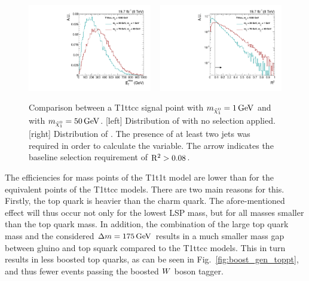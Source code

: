 \begin{figure}[htbp]
 \centering
\includegraphics[width=0.48\textwidth]{figures/razor_interpretation/Eff_drop_met}
~
\includegraphics[width=0.48\textwidth]{figures/razor_interpretation/Eff_drop_rsq}
\caption{Comparison between a T1ttcc signal point with $m_{\tilde{\chi}_1^0} = 1\,\text{Ge\hspace{-.08em}V}$ and with $m_{\tilde{\chi}_1^0} =
50\,\text{Ge\hspace{-.08em}V}$. [left] Distribution of \ETm with no selection applied.
[right] Distribution of \rsq. The presence of at least two jets was required in order to calculate
the \rsq variable. The arrow indicates the baseline selection requirement of $\mathrm{R^2} > 0.08$.
 \label{fig:boost_eff_drop_met_rsq}}
\end{figure}

The efficiencies for mass points of the T1t1t model are lower than for the equivalent points of the
T1ttcc models. There are two main reasons for this.
Firstly, the top quark is heavier than the charm quark. The afore-mentioned effect will thus occur
not only for the lowest LSP mass, but for all masses smaller than the top quark mass. 
In addition, the combination of the large top quark mass and the considered $\Delta m = 175\,\text{Ge\hspace{-.08em}V}$
results in a much smaller mass gap between gluino and top squark compared to the T1ttcc models.
This in turn results in less boosted top quarks, as can be seen in Fig.~\ref{fig:boost_gen_toppt},
and thus fewer events passing the boosted $W$ boson tagger. 



